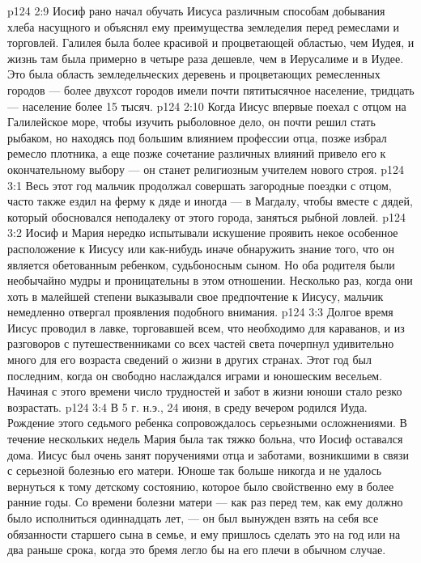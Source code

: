 \vs p124 2:9 Иосиф рано начал обучать Иисуса различным способам добывания хлеба насущного и объяснял ему преимущества земледелия перед ремеслами и торговлей. Галилея была более красивой и процветающей областью, чем Иудея, и жизнь там была примерно в четыре раза дешевле, чем в Иерусалиме и в Иудее. Это была область земледельческих деревень и процветающих ремесленных городов --- более двухсот городов имели почти пятитысячное население, тридцать --- население более 15 тысяч.
\vs p124 2:10 Когда Иисус впервые поехал с отцом на Галилейское море, чтобы изучить рыболовное дело, он почти решил стать рыбаком, но находясь под большим влиянием профессии отца, позже избрал ремесло плотника, а еще позже сочетание различных влияний привело его к окончательному выбору --- он станет религиозным учителем нового строя.
\vs p124 3:1 Весь этот год мальчик продолжал совершать загородные поездки с отцом, часто также ездил на ферму к дяде и иногда --- в Магдалу, чтобы вместе с дядей, который обосновался неподалеку от этого города, заняться рыбной ловлей.
\vs p124 3:2 Иосиф и Мария нередко испытывали искушение проявить некое особенное расположение к Иисусу или как\hyp{}нибудь иначе обнаружить знание того, что он является обетованным ребенком, судьбоносным сыном. Но оба родителя были необычайно мудры и проницательны в этом отношении. Несколько раз, когда они хоть в малейшей степени выказывали свое предпочтение к Иисусу, мальчик немедленно отвергал проявления подобного внимания.
\vs p124 3:3 Долгое время Иисус проводил в лавке, торговавшей всем, что необходимо для караванов, и из разговоров с путешественниками со всех частей света почерпнул удивительно много для его возраста сведений о жизни в других странах. Этот год был последним, когда он свободно наслаждался играми и юношеским весельем. Начиная с этого времени число трудностей и забот в жизни юноши стало резко возрастать.
\vs p124 3:4 \pc В 5 г. н.э., 24 июня, в среду вечером родился Иуда. Рождение этого седьмого ребенка сопровождалось серьезными осложнениями. В течение нескольких недель Мария была так тяжко больна, что Иосиф оставался дома. Иисус был очень занят поручениями отца и заботами, возникшими в связи с серьезной болезнью его матери. Юноше так больше никогда и не удалось вернуться к тому детскому состоянию, которое было свойственно ему в более ранние годы. Со времени болезни матери --- как раз перед тем, как ему должно было исполниться одиннадцать лет, --- он был вынужден взять на себя все обязанности старшего сына в семье, и ему пришлось сделать это на год или на два раньше срока, когда это бремя легло бы на его плечи в обычном случае.
